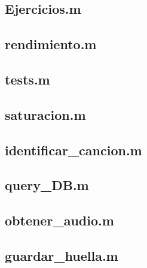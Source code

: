 \documentclass[10pt,spanish,a4paper,openany,notitlepage]{article}
\begin{document}
\newpage
\subsection{Ejercicios.m}
\label{codigo:Ejercicios}


\newpage
\subsection{rendimiento.m}
\label{codigo:rendimiento}


\subsection{tests.m}
\label{codigo:tests}


\newpage
\subsection{saturacion.m}
\label{codigo:saturacion}


\newpage
\subsection{identificar\_cancion.m}
\label{codigo:identificar_cancion}


\newpage
\subsection{query\_DB.m}
\label{codigo:query_DB}


\subsection{obtener\_audio.m}
\label{codigo:obtener_audio}


\newpage
\subsection{guardar\_huella.m}
\label{codigo:guardar_huella}

\end{document}
